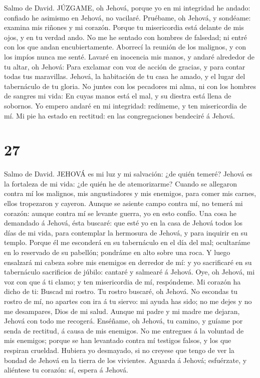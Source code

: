  Salmo de David. JÚZGAME, oh Jehová, porque yo en mi
integridad he andado: confiado he asimismo en Jehová, no vacilaré.
 Pruébame, oh Jehová, y sondéame: examina mis riñones y mi
corazón.  Porque tu misericordia está delante de mis ojos, y
en tu verdad ando.  No me he sentado con hombres de
falsedad; ni entré con los que andan encubiertamente. 
Aborrecí la reunión de los malignos, y con los impíos nunca me senté.
 Lavaré en inocencia mis manos, y andaré alrededor de tu
altar, oh Jehová:  Para exclamar con voz de acción de
gracias, y para contar todas tus maravillas.  Jehová, la
habitación de tu casa he amado, y el lugar del tabernáculo de tu gloria.
 No juntes con los pecadores mi alma, ni con los hombres de
sangres mi vida:  En cuyas manos está el mal, y su diestra
está llena de sobornos.  Yo empero andaré en mi integridad:
redímeme, y ten misericordia de mí.  Mi pie ha estado en
rectitud: en las congregaciones bendeciré á Jehová.

\hypertarget{section-26}{%
\section{27}\label{section-26}}

 Salmo de David. JEHOVÁ es mi luz y mi salvación: ¿de quién
temeré? Jehová es la fortaleza de mi vida: ¿de quién he de atemorizarme?
 Cuando se allegaron contra mí los malignos, mis
angustiadores y mis enemigos, para comer mis carnes, ellos tropezaron y
cayeron.  Aunque se asiente campo contra mí, no temerá mi
corazón: aunque contra mí se levante guerra, yo en esto confío.
 Una cosa he demandado á Jehová, ésta buscaré: que esté yo
en la casa de Jehová todos los días de mi vida, para contemplar la
hermosura de Jehová, y para inquirir en su templo.  Porque
él me esconderá en su tabernáculo en el día del mal; ocultaráme en lo
reservado de su pabellón; pondráme en alto sobre una roca. 
Y luego ensalzará mi cabeza sobre mis enemigos en derredor de mí: y yo
sacrificaré en su tabernáculo sacrificios de júbilo: cantaré y salmearé
á Jehová.  Oye, oh Jehová, mi voz con que á ti clamo; y ten
misericordia de mí, respóndeme.  Mi corazón ha dicho de ti:
Buscad mi rostro. Tu rostro buscaré, oh Jehová.  No escondas
tu rostro de mí, no apartes con ira á tu siervo: mi ayuda has sido; no
me dejes y no me desampares, Dios de mi salud.  Aunque mi
padre y mi madre me dejaran, Jehová con todo me recogerá. 
Enséñame, oh Jehová, tu camino, y guíame por senda de rectitud, á causa
de mis enemigos.  No me entregues á la voluntad de mis
enemigos; porque se han levantado contra mí testigos falsos, y los que
respiran crueldad.  Hubiera yo desmayado, si no creyese que
tengo de ver la bondad de Jehová en la tierra de los vivientes.
 Aguarda á Jehová; esfuérzate, y aliéntese tu corazón: sí,
espera á Jehová.

